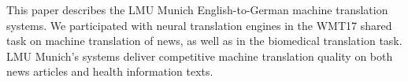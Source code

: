 This paper describes the LMU Munich English-to-German machine translation systems. We participated with neural translation engines in the WMT17 shared task on machine translation of news, as well as in the biomedical translation task. LMU Munich's systems deliver competitive machine translation quality on both news articles and health information texts.
